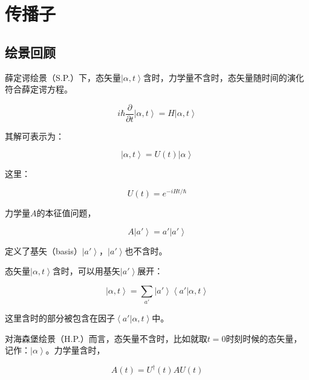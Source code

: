 \section{传播子}

\subsection{绘景回顾}

薛定谔绘景（S.P.）下，态矢量$\left| \alpha, t \right\rangle$含时，力学量不含时，态矢量随时间的演化符合薛定谔方程。

\begin{equation}
i \hbar \frac{\partial }{\partial t} \left| \alpha, t \right\rangle = H \left| \alpha, t \right\rangle 
\end{equation}

其解可表示为：

\begin{equation}
\left| \alpha, t \right\rangle = U(t) \left| \alpha \right\rangle
\end{equation}

这里：

\begin{equation}
U(t) = e^{-iHt / \hbar}
\end{equation}

力学量$A$的本征值问题，

\begin{equation}
A \left| a' \right\rangle = a' \left| a' \right\rangle 
\end{equation}

定义了基矢（basis）$\left| a' \right\rangle$，$\left| a' \right\rangle$也不含时。

态矢量$\left| \alpha, t \right\rangle$含时，可以用基矢$\left| a' \right\rangle$展开：

\begin{equation}
\left| \alpha, t \right\rangle = \sum\limits_{a'} \left| a' \right\rangle \left\langle a' | \alpha, t \right\rangle 
\end{equation}

这里含时的部分被包含在因子$\left\langle a' | \alpha, t \right\rangle $中。

对海森堡绘景（H.P.）而言，态矢量不含时，比如就取$t=0$时刻时候的态矢量，记作：$\left| \alpha \right\rangle$。力学量含时，

\begin{equation}
A(t) = U^\dagger (t) A U (t)
\end{equation}

